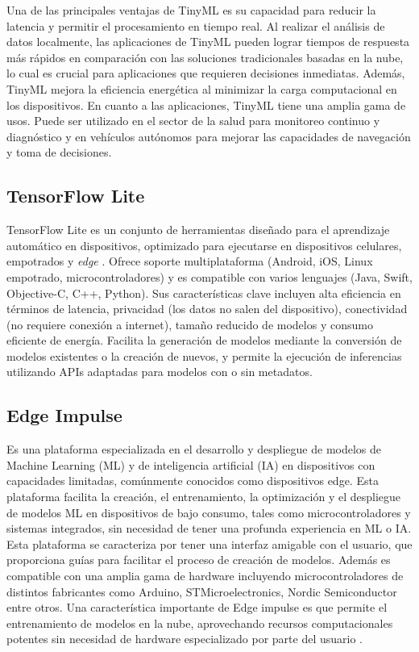 Una de las principales ventajas de TinyML es su capacidad para reducir la latencia y permitir el procesamiento en tiempo real. Al realizar el análisis de datos localmente, las aplicaciones de TinyML pueden lograr tiempos de respuesta más rápidos en comparación con las soluciones tradicionales basadas en la nube, lo cual es crucial para aplicaciones que requieren decisiones inmediatas. Además, TinyML mejora la eficiencia energética al minimizar la carga computacional en los dispositivos. En cuanto a las aplicaciones, TinyML tiene una amplia gama de usos. Puede ser utilizado en el sector de la salud para monitoreo continuo y diagnóstico y en vehículos autónomos para mejorar las capacidades de navegación y toma de decisiones. 

\subsection{TensorFlow Lite}
TensorFlow Lite es un conjunto de herramientas diseñado para el aprendizaje automático en dispositivos, optimizado para ejecutarse en dispositivos celulares, empotrados y \textit{edge} \cite{TFL}. Ofrece soporte multiplataforma (Android, iOS, Linux empotrado, microcontroladores) y es compatible con varios lenguajes (Java, Swift, Objective-C, C++, Python). Sus características clave incluyen alta eficiencia en términos de latencia, privacidad (los datos no salen del dispositivo), conectividad (no requiere conexión a internet), tamaño reducido de modelos y consumo eficiente de energía. Facilita la generación de modelos mediante la conversión de modelos existentes o la creación de nuevos, y permite la ejecución de inferencias utilizando APIs adaptadas para modelos con o sin metadatos.

\subsection{Edge Impulse}
Es una plataforma especializada en el desarrollo y despliegue de modelos de Machine Learning (ML) y de inteligencia artificial (IA) en dispositivos con capacidades limitadas, comúnmente conocidos como dispositivos edge. Esta plataforma facilita la creación, el entrenamiento, la optimización y el despliegue de modelos ML en dispositivos de bajo consumo, tales como microcontroladores y sistemas integrados, sin necesidad de tener una profunda experiencia en ML o IA. Esta plataforma se caracteriza por tener una interfaz amigable con el usuario, que proporciona guías para facilitar el proceso de creación de modelos. Además es compatible con una amplia gama de hardware incluyendo microcontroladores de distintos fabricantes como Arduino, STMicroelectronics, Nordic Semiconductor entre otros. Una característica importante de Edge impulse es que permite el entrenamiento de modelos en la nube, aprovechando recursos computacionales potentes sin necesidad de hardware especializado por parte del usuario \cite{Impulse_2020}.


